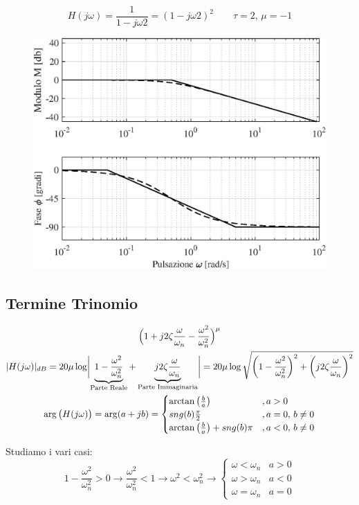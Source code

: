 \begin{nexample}
	\[ H(j\omega) = \frac{1}{1-j\omega2} = (1-j\omega2)^2 \qquad\tau = 2, \, \mu = -1 \]
\begin{figure}[H]
	\centering
	\includegraphics[width=0.7\linewidth]{immagini/cap6_Bode/es4.eps}
	\label{fig:Bode_es4}
\end{figure}	
\end{nexample}

\subsection{Termine Trinomio}
\begin{gather*}
	\Big(1+j2\zeta\frac{\omega}{\omega_{n}}-\frac{\omega^2}{\omega^{2}_{n}} \Big)^{\mu}\\
	\abs{H(j\omega)}_{dB} = 20 \mu \log \Abs{\underbrace{1-\frac{\omega^2}{\omega^{2}_{n}}}_{\text{\scriptsize Parte Reale}}+\underbrace{j2\zeta\frac{\omega}{\omega_{n}}}_{\text{\scriptsize Parte Immaginaria}}} = 20\mu \log \sqrt{\bigg(1-\frac{\omega^2}{\omega^{2}_{n}} \bigg)^2+\bigg(j2\zeta\frac{\omega}{\omega_{n}}\bigg)^2}\\
	\arg\big(H(j\omega)\big) = \arg(a+jb) = 
	\begin{cases}
		\arctan\big(\frac{b}{a}\big) & ,a>0\\
		\sng(b)\frac{\pi}{2} & ,a=0,\, b \ne 0\\
		\arctan\big(\frac{b}{a}\big) + \sng(b)\pi & ,a<0,\, b \ne 0 
	\end{cases} 
\end{gather*}

Studiamo i vari casi:
\[ 
	1-\frac{\omega^2}{\omega^{2}_{n}}>0 \rightarrow \frac{\omega^2}{\omega^{2}_{n}} <1 \rightarrow \omega^2 < \omega^2_n \rightarrow 
	\begin{cases}
		\omega < \omega_n &a>0\\
		\omega > \omega_n &a<0\\
		\omega = \omega_n &a=0
	\end{cases}
\]

